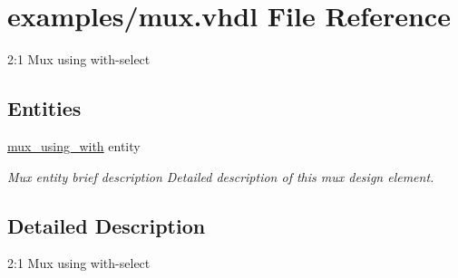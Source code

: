 \hypertarget{mux_8vhdl}{}\section{examples/mux.vhdl File Reference}
\label{mux_8vhdl}


2\+:1 Mux using with-\/select  


\subsection*{Entities}
\begin{DoxyCompactItemize}
\item 
\hyperlink{classmux__using__with}{mux\+\_\+using\+\_\+with} entity
\begin{DoxyCompactList}\small\item\em Mux entity brief description Detailed description of this mux design element. \end{DoxyCompactList}\end{DoxyCompactItemize}


\subsection{Detailed Description}
2\+:1 Mux using with-\/select 

